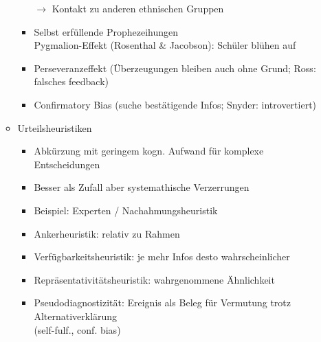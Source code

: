 \documentclass[11pt, paper=a4, twocolumn]{scrartcl}
\begin{document}
\begin{itemize}
\begin{itemize}
\begin{itemize}
								$\rightarrow$ Kontakt zu anderen ethnischen Gruppen
							\item Selbst erfüllende Prophezeihungen\\
								Pygmalion-Effekt (Rosenthal \& Jacobson): Schüler blühen auf
							\item Perseveranzeffekt (Überzeugungen bleiben auch ohne Grund; Ross: falsches feedback)
							\item Confirmatory Bias (suche bestätigende Infos; Snyder: introvertiert)
						\end{itemize}
					\item Urteilsheuristiken
						\begin{itemize}
							\item  Abkürzung mit geringem kogn. Aufwand für komplexe Entscheidungen
							\item Besser als Zufall aber systemathische Verzerrungen
							\item Beispiel: Experten / Nachahmungsheuristik
							\item Ankerheuristik: relativ zu Rahmen
							\item Verfügbarkeitsheuristik: je mehr Infos desto wahrscheinlicher
							\item Repräsentativitätsheuristik: wahrgenommene Ähnlichkeit
							\item Pseudodiagnostizität: Ereignis als Beleg für Vermutung trotz Alternativerklärung\\
								(self-fulf., conf. bias)
						\end{itemize}
				\end{itemize}


\end{itemize}
\end{document}
